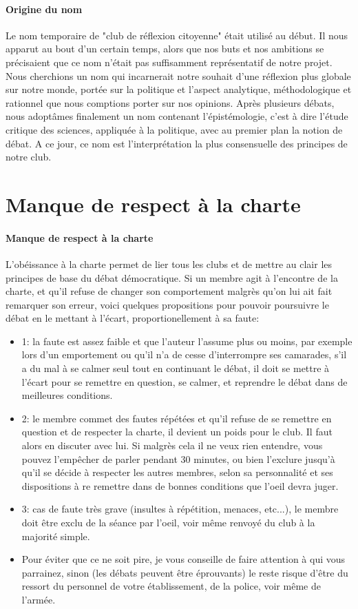 \documentclass[a4paper,11pt]{article}
\begin{document}
\paragraph{Origine du nom}
Le nom temporaire de "club de réflexion citoyenne" était utilisé au début. Il nous apparut au bout d'un certain temps, alors que nos buts et nos ambitions se précisaient que ce nom n'était pas suffisamment représentatif de notre projet. Nous cherchions un nom qui incarnerait notre souhait d'une réflexion plus globale sur notre monde, portée sur la politique et l'aspect analytique, méthodologique et rationnel que nous comptions porter sur nos opinions. Après plusieurs débats, nous adoptâmes finalement un nom contenant l'épistémologie, c'est à dire l'étude critique des sciences, appliquée à la politique, avec au premier plan la notion de débat. A ce jour, ce nom est l'interprétation la plus consensuelle des principes de notre club.

\section{Manque de respect à la charte}
\paragraph{Manque de respect à la charte}
L'obéissance à la charte permet de lier tous les clubs et de mettre au clair les principes de base du débat démocratique. Si un membre agit à l'encontre de la charte, et qu'il refuse de changer son comportement malgrès qu'on lui ait fait remarquer son erreur, voici quelques propositions pour pouvoir poursuivre le débat en le mettant à l'écart, proportionellement à sa faute:
\begin{itemize}
  \item 1: la faute est assez faible et que l'auteur l'assume plus ou moins, par exemple lors d'un emportement ou qu'il n'a de cesse d'interrompre ses camarades, s'il a du mal à se calmer seul tout en continuant le débat, il doit se mettre à l'écart pour se remettre en question, se calmer, et reprendre le débat dans de meilleures conditions.
  \item 2: le membre commet des fautes répétées et qu'il refuse de se remettre en question et de respecter la charte, il devient un poids pour le club. Il faut alors en discuter avec lui. Si malgrès cela il ne veux rien entendre, vous pouvez l'empêcher de parler pendant 30 minutes, ou bien l'exclure jusqu'à qu'il se décide à respecter les autres membres, selon sa personnalité et ses dispositions à re remettre dans de bonnes conditions que l'oeil devra juger.
  \item 3: cas de faute très grave (insultes à répétition, menaces, etc...), le membre doit être exclu de la séance par l'oeil, voir même renvoyé du club à la majorité simple.
  \item Pour éviter que ce ne soit pire, je vous conseille de faire attention à qui vous parrainez, sinon (les débats peuvent être éprouvants) le reste risque d'être du ressort du personnel de votre établissement, de la police, voir même de l'armée.
\end{itemize}
\end{document}
